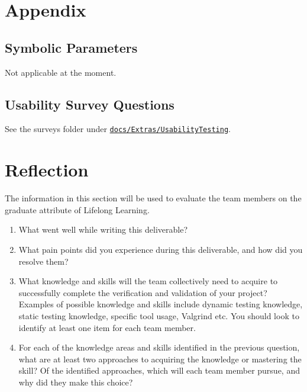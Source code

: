 \documentclass[12pt, titlepage]{article}
\begin{document}
  \newpage

  \begin{appendices}

    \section{Appendix}


    \subsection{Symbolic Parameters}

    Not applicable at the moment.

    \subsection{Usability Survey Questions} \label{A.2}

    See the surveys folder under \href{https://github.com/ssm-lab/capstone--source-code-optimizer/tree/main/docs/Extras/UsabilityTesting/surveys}{\texttt{docs/Extras/UsabilityTesting}}.

    \newpage{}
    \section{Reflection}


    The information in this section will be used to evaluate the team
    members on the
    graduate attribute of Lifelong Learning.

    

    \begin{enumerate}
      \item What went well while writing this deliverable?
      \item What pain points did you experience during this deliverable, and how
        did you resolve them?
      \item What knowledge and skills will the team collectively need
        to acquire to
        successfully complete the verification and validation of your project?
        Examples of possible knowledge and skills include dynamic
        testing knowledge,
        static testing knowledge, specific tool usage, Valgrind etc.
        You should look to
        identify at least one item for each team member.
      \item For each of the knowledge areas and skills identified in
        the previous
        question, what are at least two approaches to acquiring the knowledge or
        mastering the skill?  Of the identified approaches, which will each team
        member pursue, and why did they make this choice?
    \end{enumerate}


\end{appendices}
\end{document}
